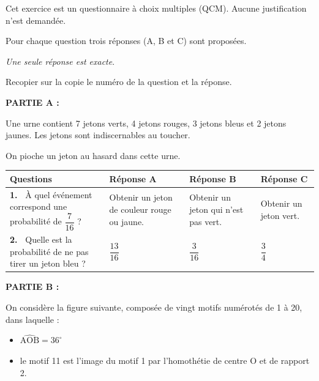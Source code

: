 
\medskip

Cet exercice est un questionnaire à choix multiples (QCM). Aucune justification n'est demandée.

Pour chaque question trois réponses (A, B et C) sont proposées. 

\emph{Une seule réponse est exacte}. 

Recopier sur la copie le numéro de la question et la réponse.

\bigskip

\textbf{PARTIE A :}

\medskip

Une urne contient 7 jetons verts, 4 jetons rouges, 3 jetons bleus et 2 jetons jaunes. Les jetons sont indiscernables au toucher. 

On pioche un jeton au hasard dans cette urne.

\begin{center}
\begin{tabularx}{\linewidth}{|m{2.25cm}|*{3}{X|}}\hline
\textbf{Questions}&\textbf{Réponse A}&\textbf{Réponse B}&\textbf{Réponse C}\\ \hline
\textbf{1.~} À quel événement correspond une probabilité de $\dfrac{7}{16}$ ?&Obtenir un jeton de couleur rouge ou jaune.&Obtenir un jeton qui n'est pas vert.&Obtenir un jeton vert.\\ \hline
\textbf{2.~} Quelle est la probabilité de ne pas tirer un jeton
bleu ?& \qquad \qquad$\dfrac{13}{16}$ &\qquad  \qquad$\dfrac{3}{16}$ &\qquad  \qquad$\dfrac{3}{4}$\\ \hline
\end{tabularx}
\end{center}

\bigskip

\textbf{PARTIE B :}

\medskip

On considère la figure suivante, composée de vingt motifs numérotés de 1 à 20, dans laquelle : 

\setlength\parindent{9mm}
\begin{itemize}
\item[$\bullet~~$] $\widehat{\text{AOB}} =  36^\circ$
\item[$\bullet~~$] le motif 11 est l'image du motif 1 par l'homothétie de centre O et de rapport 2.
\end{itemize}
\setlength\parindent{0mm}

